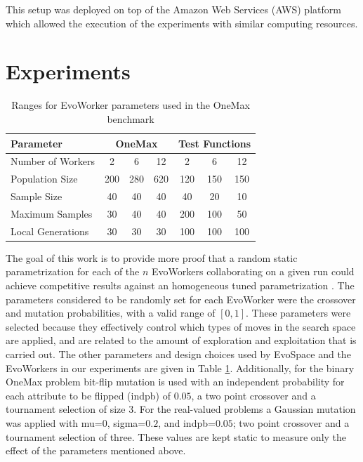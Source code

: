 \documentclass[conference]{IEEEtran}
\begin{document}
This setup was deployed on top of the Amazon Web Services (AWS)
platform which allowed the execution of the experiments with similar computing resources.

\section{Experiments}
 \label{sec:experiments}

\begin{table}[!t]
\caption{Ranges for EvoWorker parameters used in the OneMax benchmark}
\label{tab:params}
\centering
\begin{tabular}{|l|c|c|c|c|c|c| }
\hline
\textbf{Parameter} & \multicolumn{3}{|c|}{OneMax} & \multicolumn{3}{|c|}{Test Functions} \\
\hline
Number of Workers & 2 & 6 & 12 & 2 & 6 & 12\\
\hline
\hline
Population Size & 200 & 280 & 620 & 120 & 150 & 150\\
\hline
Sample Size & 40 & 40 & 40 & 40 & 20 & 10\\
\hline
Maximum Samples & 30 & 40 & 40 & 200 & 100 & 50\\
\hline
Local Generations & 30 & 30 & 30 & 100 & 100 & 100\\
\hline
\end{tabular}
\end{table}
%
The goal of this work is to provide more proof that a random static parametrization for each of the $n$ EvoWorkers
collaborating on a given run could achieve competitive results against an homogeneous tuned parametrization
\cite{fuku1,fuku2,LNCS86720702}. The parameters considered to be randomly set for each EvoWorker
were the crossover and mutation probabilities, with a valid range of $[0,1]$. These parameters were
selected because they effectively control which types of moves in the search space are
applied, and are related to the amount of exploration and exploitation
that is carried out. %
The other parameters and design choices used by EvoSpace and the EvoWorkers in our experiments are given in
Table \ref{tab:params}. Additionally, for the binary OneMax problem bit-flip mutation
is used with an independent probability for each attribute to be flipped (indpb) of $0.05$,
a two point crossover and a tournament selection of size 3. For the real-valued problems a Gaussian
mutation was applied with mu=$0$, sigma=$0.2$, and indpb=$0.05$; two point crossover and
a tournament selection of three. These values are kept static to measure only the effect of the
parameters mentioned above.
\end{document}
